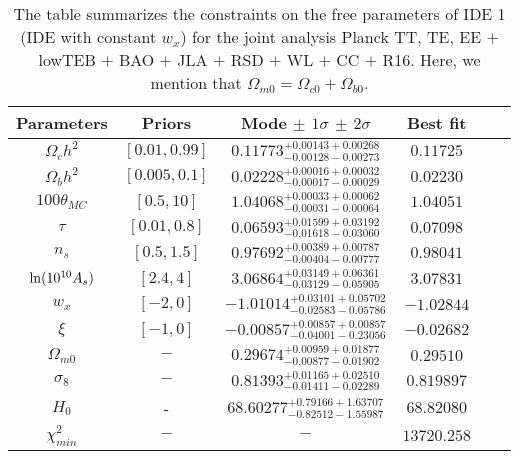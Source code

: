 \documentclass[superscriptaddress,oneolumn,secnumarabic,
amssymb,amsmath,nobibnotes,aps,prd,showpacs,nofootinbib]{revtex4}%
\begin{document}
\begingroup
\squeezetable
\begin{table}
\caption{The table summarizes the constraints on the free parameters of IDE 1 (IDE with constant $w_x$) for the joint analysis Planck TT, TE, EE $+$ lowTEB $+$ BAO $+$ JLA $+$ RSD $+$ WL $+$ CC $+$ R16. Here, we mention that $\Omega_{m0}= \Omega_{c0}+ \Omega_{b0}$.}
\begin{tabular}{cccccc}
\hline\hline
Parameters & Priors & Mode $\pm$ $1\sigma$ $\pm$ $2\sigma$  & Best fit \\ \hline\hline
$\Omega_c h^2$ & $[0.01, 0.99]$ & $ 0.11773_{-    0.00128-    0.00273}^{+    0.00143+    0.00268}$ & $    0.11725$\\

$\Omega_b h^2$ & $[0.005, 0.1]$ & $0.02228_{-    0.00017-    0.00029}^{+    0.00016+    0.00032}$ &  $    0.02230$\\

$100\theta_{MC}$ & $[0.5, 10]$  & $1.04068_{-    0.00031-    0.00064}^{+    0.00033+    0.00062}$ &   $1.04051$\\

$\tau$ &   $[0.01, 0.8]$ & $0.06593_{-    0.01618-    0.03060}^{+    0.01599+    0.03192}$ &  $    0.07098$\\

$n_s$ & $[0.5, 1.5]$ & $0.97692_{-    0.00404-    0.00777}^{+    0.00389+    0.00787}$ &  $ 0.98041$\\

${\rm{ln}}(10^{10} A_s)$ & $[2.4, 4]$ & $3.06864_{-    0.03129-    0.05905}^{+    0.03149+    0.06361}$ &  $    3.07831$\\
\hline
$w_x$ & $[-2, 0]$  & $-1.01014_{-    0.02583-    0.05786}^{+    0.03101+    0.05702}$ &  $   -1.02844$\\

$\xi$ & $[-1, 0]$ & $-0.00857_{-    0.04001-    0.23056}^{+    0.00857+    0.00857}$ &  $   -0.02682$\\
\hline
$\Omega_{m0}$ & $-$ & $0.29674_{-    0.00877-    0.01902}^{+    0.00959+    0.01877}$ &  $    0.29510$\\

$\sigma_8$ &  $-$ & $0.81393_{-    0.01411-    0.02289}^{+    0.01165+    0.02510}$ &  $    0.819897$\\

$H_0$ &  - & $ 68.60277_{-    0.82512-    1.55987}^{+    0.79166+    1.63707}$ & $   68.82080$\\
\hline
$\chi^2_{min}$ & $-$ & $-$  & $13720.258$\\
\hline
\end{tabular}
\label{tab:constantw}
\end{table}
\endgroup
\end{document}
